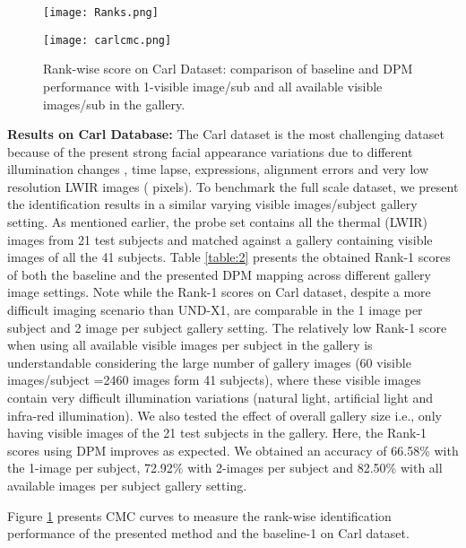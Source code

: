 \documentclass[smallextended,natbib]{svjour3}       \usepackage{graphicx}
\begin{document}
\begin{figure}
  \begin{minipage}[t]{0.48\textwidth}  
    \texttt{[image: Ranks.png]}
	\caption{Rank-wise score on UND X1: comparison of baseline and DPM performance with 1-visible image/sub and all available visible images/sub in the gallery.}
    \label{fig:3}
  \end{minipage}
  \hfill
  \begin{minipage}[t]{0.48\textwidth}
    \texttt{[image: carlcmc.png]}
\caption{Rank-wise score on Carl Dataset: comparison of baseline and DPM performance with 1-visible image/sub and all available visible images/sub in the gallery.}    
\label{fig:4}
  \end{minipage}
\end{figure}    
\noindent\textbf{Results on Carl Database:} The Carl dataset is the most challenging dataset because of the present strong facial appearance variations due to different illumination changes , time lapse, expressions, alignment errors and very low resolution LWIR images ( pixels). To benchmark the full scale dataset, we present the identification results in a similar varying visible images/subject gallery setting. As mentioned earlier, the probe set contains all the thermal (LWIR) images from 21  test subjects and matched against a gallery containing visible images of all the 41 subjects. Table \ref{table:2} presents the obtained Rank-1 scores of both the baseline and the presented DPM mapping across different gallery image settings. Note while the Rank-1 scores on Carl dataset, despite a more difficult imaging scenario than UND-X1, are comparable in the 1 image per subject and 2 image per subject gallery setting. The relatively low Rank-1 score when using all available visible images per subject in the gallery is understandable considering the large number of gallery images (60 visible images/subject =2460 images form 41 subjects), where these visible images contain very difficult illumination variations (natural light, artificial light and infra-red illumination). We also tested the effect of overall gallery size i.e., only having visible images of the 21 test subjects in the gallery. Here, the Rank-1 scores using DPM improves as expected. We obtained an accuracy of 66.58\% with the 1-image per subject, 72.92\% with 2-images per subject and 82.50\% with all available images per subject gallery setting.

Figure \ref{fig:4} presents CMC curves to measure the rank-wise identification performance of the presented method and the baseline-1 on Carl dataset.
   
\end{document}
